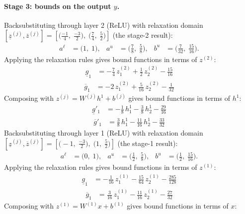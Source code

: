 \documentclass[11pt]{article}
\begin{document}
\paragraph{Stage 3: bounds on the output $y$.}
Backsubstituting through layer 2 (ReLU) with relaxation domain $[\underline{z}^{(j)}, \overline{z}^{(j)}] = [\bigl(\frac{-1}{4},\; \frac{-3}{2}\bigr),\; \bigl(\frac{7}{4},\; \frac{5}{2}\bigr)]$ (the stage-2 result):
\begin{align*}
a^{\ell} &= \bigl(1,\; 1\bigr), & a^{u} &= \bigl(\frac{7}{8},\; \frac{5}{8}\bigr), & b^{u} &= \bigl(\frac{7}{32},\; \frac{15}{16}\bigr).
\end{align*}
Applying the relaxation rules gives bound functions in terms of $z^{(2)}$:
\begin{align*}
\underline{g}_{1} &= -\frac{7}{4}\,z^{(2)}_{1} + \frac{1}{2}\,z^{(2)}_{2} - \frac{15}{16}
\end{align*}
\begin{align*}
\overline{g}_{1} &= -2\,z^{(2)}_{1} + \frac{5}{16}\,z^{(2)}_{2} - \frac{1}{32}
\end{align*}
Composing with $z^{(j)} = W^{(j)} h^{1} + b^{(j)}$ gives bound functions in terms of $h^{1}$:
\begin{align*}
\underline{g}'_{1} &= -\frac{1}{8}\,h^{1}_{1} - \frac{3}{8}\,h^{1}_{2} - \frac{29}{16}
\end{align*}
\begin{align*}
\overline{g}'_{1} &= \frac{3}{8}\,h^{1}_{1} - \frac{11}{16}\,h^{1}_{2} - \frac{33}{32}
\end{align*}
Backsubstituting through layer 1 (ReLU) with relaxation domain $[\underline{z}^{(j)}, \overline{z}^{(j)}] = [\bigl(-1,\; \frac{-3}{2}\bigr),\; \bigl(1,\; \frac{5}{2}\bigr)]$ (the stage-1 result):
\begin{align*}
a^{\ell} &= \bigl(0,\; 1\bigr), & a^{u} &= \bigl(\frac{1}{2},\; \frac{5}{8}\bigr), & b^{u} &= \bigl(\frac{1}{2},\; \frac{15}{16}\bigr).
\end{align*}
Applying the relaxation rules gives bound functions in terms of $z^{(1)}$:
\begin{align*}
\underline{g}_{1} &= -\frac{1}{16}\,z^{(1)}_{1} - \frac{15}{64}\,z^{(1)}_{2} - \frac{285}{128}
\end{align*}
\begin{align*}
\overline{g}_{1} &= \frac{3}{16}\,z^{(1)}_{1} - \frac{11}{16}\,z^{(1)}_{2} - \frac{27}{32}
\end{align*}
Composing with $z^{(1)} = W^{(1)} x + b^{(1)}$ gives bound functions in terms of $x$:
\end{document}
